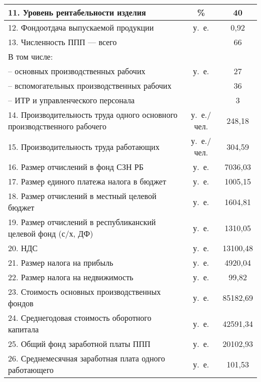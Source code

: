 {\begin{longtable}{| m{10.2cm} | c | c |}
      11. Уровень рентабельности изделия & \% & 40 \\
      \hline

      12. Фондоотдача выпускаемой продукции & у.~е. & 0{,}92 \\
      \hline

      13. Численность ППП --- всего & \multirow{5}{*}{у.~е.} & 66 \\
      В том числе: & & \\
      -- основных производственных рабочих & & 27 \\
      -- вспомогательных производственных рабочих & & 36 \\ \hline
      -- ИТР и управленческого персонала & & 3 \\ 
      \hline

      14. Производительность труда одного \newline 
      основного производственного рабочего 
      & у.~е./чел. & 248{,}18 \\
      \hline

      15. Производительность труда работающих
      & у.~е./чел. & 304{,}59 \\
      \hline

      16. Размер отчислений в фонд СЗН РБ
      & у.~е. & 7036{,}03 \\
      \hline

      17. Размер единого платежа налога в бюджет
      & у.~е. & 1005{,}15 \\
      \hline

      18. Размер отчислений в местный целевой бюджет
      & у.~е. & 1604{,}81 \\
      \hline

      19. Размер отчислений в республиканский целевой фонд \newline (с/х, ДФ)
      & у.~е. & 1310{,}05 \\
      \hline

      20. НДС
      & у.~е. & 13100{,}48 \\
      \hline

      21. Размер налога на прибыль
      & у.~е. & 4920{,}04 \\
      \hline

      22. Размер налога на недвижимость
      & у.~е. & 99{,}82 \\
      \hline

      23. Стоимость основных производственных фондов
      & у.~е. & 85182{,}69 \\
      \hline

      24. Среднегодовая стоимость оборотного капитала
      & у.~е. & 42591{,}34 \\
      \hline

      25. Общий фонд заработной платы ППП
      & у.~е. & 20102{,}93 \\
      \hline

      26. Среднемесячная заработная плата одного \newline работающего
      & у.~е. & 101{,}53 \\
      \hline
\end{longtable}
}
